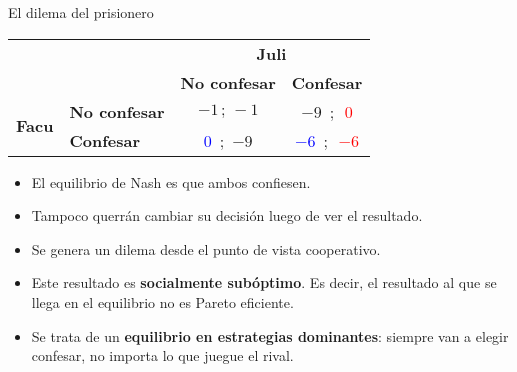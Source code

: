 \documentclass{beamer}
\begin{document}
\begin{frame}{El dilema del prisionero}
    \centering
    \setlength{\tabcolsep}{12pt}
    \renewcommand{\arraystretch}{1.3}
    
    \begin{tabular}{@{} l l | c c @{}}
    \multicolumn{2}{c}{} & \multicolumn{2}{c}{\textbf{Juli}} \\
    \multicolumn{2}{c}{} & \textbf{No confesar} & \textbf{Confesar} \\
    \midrule
    \multirow{2}{*}{\textbf{Facu}}
      & \textbf{No confesar} & $-1 \,;\, -1$ & $-9$ $\,; \,$ \textcolor{red}{$0$} \\
      & \textbf{Confesar}     & \textcolor{blue}{$0$} \,;\, $-9$  & \textcolor{blue}{$-6$}  $\,; \,$ \textcolor{red}{$-6$} \\ \midrule
    \end{tabular}

    \vspace{4mm}
    \begin{itemize}
        \item El equilibrio de Nash es que ambos confiesen.
        \item Tampoco querrán cambiar su decisión luego de ver el resultado.
        \item Se genera un dilema desde el punto de vista cooperativo.
        \item Este resultado es \textbf{socialmente subóptimo}. Es decir, el resultado al que se llega en el equilibrio no es Pareto eficiente.
        \item Se trata de un \textbf{equilibrio en estrategias dominantes}: siempre van a elegir confesar, no importa lo que juegue el rival.
    \end{itemize}

\end{frame}

\end{document}
